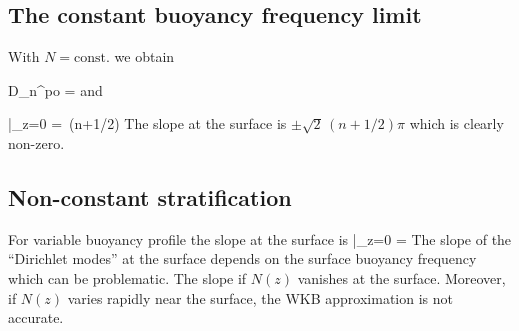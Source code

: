 \documentclass[11pt]{article}
\begin{document}
\subsection*{The constant buoyancy frequency limit}
With $N = \text{const.}$ we obtain

\beq
D_n^{po} =  \cos\left[\pi\,(n+1/2)(1+z/H)\right]\com
\eeq
and

\beq
{}\Bigg|_{z=0} = \,(n+1/2)\pi \sin \left[\pi\,(n+1/2)(1+z/H)\right]\per
\eeq
The slope at the surface is $\pm\sqrt{2} \,(n+1/2)\pi$ which is clearly non-zero.

\subsection*{Non-constant stratification}
For variable buoyancy profile the slope at the surface is
\beq
{}\Bigg|_{z=0} =  \per
\eeq
The slope of the ``Dirichlet modes'' at the surface depends on the surface buoyancy frequency which can be problematic. The slope if $N(z)$ vanishes at the surface. Moreover, if $N(z)$ varies rapidly near the surface, the WKB approximation is not accurate.       
\end{document}
